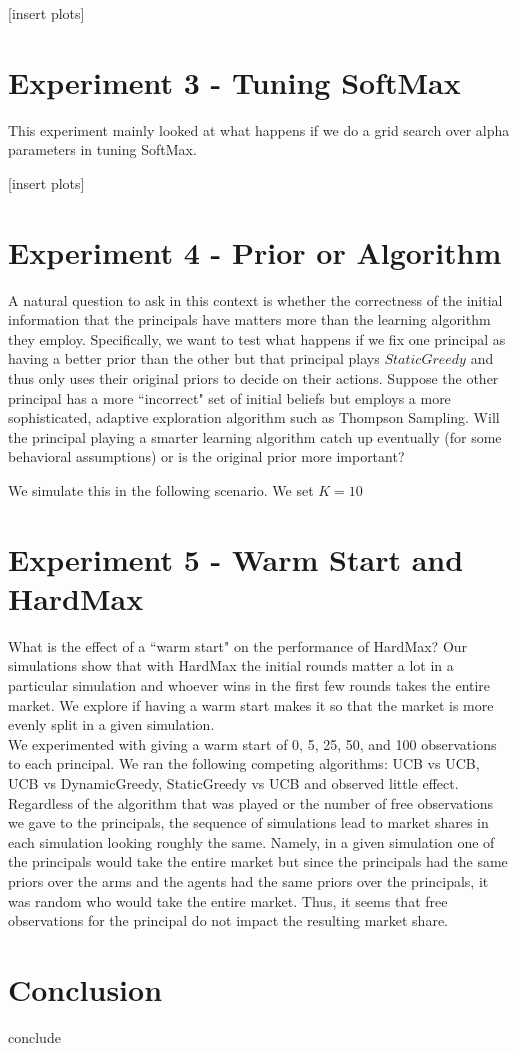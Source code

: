 \documentclass[a4paper]{article}
\begin{document}
[insert plots]

\section*{Experiment 3 - Tuning SoftMax} %
This experiment mainly looked at what happens if we do a grid search over alpha parameters in tuning SoftMax. %

[insert plots]

\section*{Experiment 4 - Prior or Algorithm}
A natural question to ask in this context is whether the correctness of the initial information that the principals have matters more than the learning algorithm they employ. Specifically, we want to test what happens if we fix one principal as having a better prior than the other but that principal plays $StaticGreedy$ and thus only uses their original priors to decide on their actions.   Suppose the other principal has a more ``incorrect" set of initial beliefs but employs a more sophisticated, adaptive exploration algorithm such as Thompson Sampling. Will the principal playing a smarter learning algorithm catch up eventually (for some behavioral assumptions) or is the original prior more important?

We simulate this in the following scenario. We set $K = 10$

\section*{Experiment 5 - Warm Start and HardMax}
What is the effect of a ``warm start" on the performance of HardMax? Our simulations show that with HardMax the initial rounds matter a lot in a particular simulation and whoever wins in the first few rounds takes the entire market. We explore if having a warm start makes it so that the market is more evenly split in a given simulation.\\

We experimented with giving a warm start of 0, 5, 25, 50, and 100 observations to each principal. We ran the following competing algorithms: UCB vs UCB, UCB vs DynamicGreedy, StaticGreedy vs UCB and observed little effect. Regardless of the algorithm that was played or the number of free observations we gave to the principals, the sequence of simulations lead to market shares in each simulation looking roughly the same. Namely, in a given simulation one of the principals would take the entire market but since the principals had the same priors over the arms and the agents had the same priors over the principals, it was random who would take the entire market. Thus, it seems that free observations for the principal do not impact the resulting market share. 

\section*{Conclusion}
conclude
\end{document}
